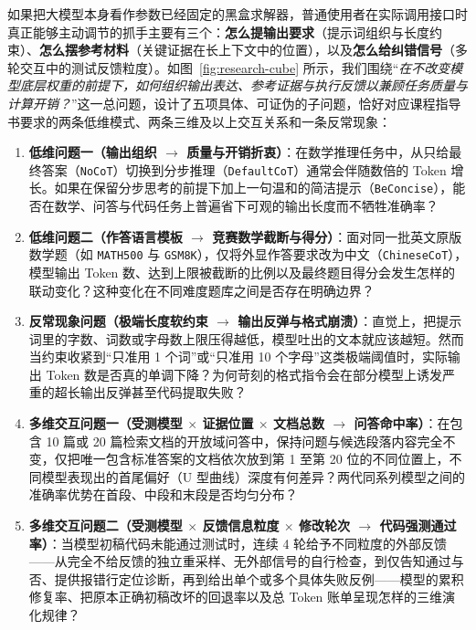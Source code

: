 如果把大模型本身看作参数已经固定的黑盒求解器，普通使用者在实际调用接口时真正能够主动调节的抓手主要有三个：\textbf{怎么提输出要求}（提示词组织与长度约束）、\textbf{怎么摆参考材料}（关键证据在长上下文中的位置），以及\textbf{怎么给纠错信号}（多轮交互中的测试反馈粒度）。如图~\ref{fig:research-cube} 所示，我们围绕“\emph{在不改变模型底层权重的前提下，如何组织输出表达、参考证据与执行反馈以兼顾任务质量与计算开销？}”这一总问题，设计了五项具体、可证伪的子问题，恰好对应课程指导书要求的两条低维模式、两条三维及以上交互关系和一条反常现象：

\begin{enumerate}
  \item \textbf{低维问题一（输出组织 $\to$ 质量与开销折衷）}：在数学推理任务中，从只给最终答案（\texttt{NoCoT}）切换到分步推理（\texttt{DefaultCoT}）通常会伴随数倍的 Token 增长。如果在保留分步思考的前提下加上一句温和的简洁提示（\texttt{BeConcise}），能否在数学、问答与代码任务上普遍省下可观的输出长度而不牺牲准确率？
  \item \textbf{低维问题二（作答语言模板 $\to$ 竞赛数学截断与得分）}：面对同一批英文原版数学题（如 \texttt{MATH500} 与 \texttt{GSM8K}），仅将外显作答要求改为中文（\texttt{ChineseCoT}），模型输出 Token 数、达到上限被截断的比例以及最终题目得分会发生怎样的联动变化？这种变化在不同难度题库之间是否存在明确边界？
  \item \textbf{反常现象问题（极端长度软约束 $\to$ 输出反弹与格式崩溃）}：直觉上，把提示词里的字数、词数或字母数上限压得越低，模型吐出的文本就应该越短。然而当约束收紧到“只准用 1 个词”或“只准用 10 个字母”这类极端阈值时，实际输出 Token 数是否真的单调下降？为何苛刻的格式指令会在部分模型上诱发严重的超长输出反弹甚至代码提取失败？
  \item \textbf{多维交互问题一（受测模型 $\times$ 证据位置 $\times$ 文档总数 $\to$ 问答命中率）}：在包含 10 篇或 20 篇检索文档的开放域问答中，保持问题与候选段落内容完全不变，仅把唯一包含标准答案的文档依次放到第 1 至第 20 位的不同位置上，不同模型表现出的首尾偏好（U 型曲线）深度有何差异？两代同系列模型之间的准确率优势在首段、中段和末段是否均匀分布？
  \item \textbf{多维交互问题二（受测模型 $\times$ 反馈信息粒度 $\times$ 修改轮次 $\to$ 代码强测通过率）}：当模型初稿代码未能通过测试时，连续 4 轮给予不同粒度的外部反馈——从完全不给反馈的独立重采样、无外部信号的自行检查，到仅告知通过与否、提供报错行定位诊断，再到给出单个或多个具体失败反例——模型的累积修复率、把原本正确初稿改坏的回退率以及总 Token 账单呈现怎样的三维演化规律？
\end{enumerate}

